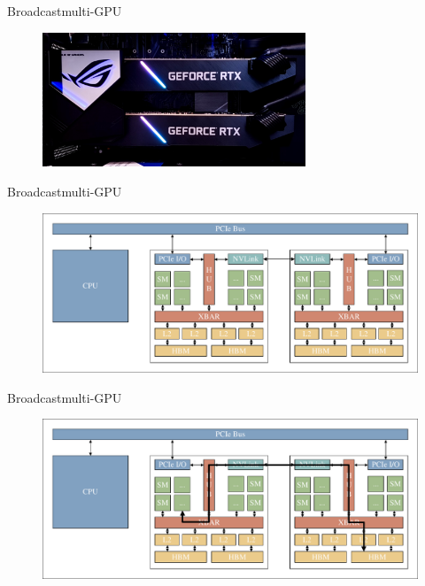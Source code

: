 \documentclass[aspectratio=169,compress]{beamer}
\begin{document}
\begin{frame}[fragile]{Broadcast}{multi-GPU}
\centering
	\begin{figure}
		\includegraphics[width=0.7\textwidth]{nvlink.png}
	\end{figure}
\end{frame}

\begin{frame}[fragile]{Broadcast}{multi-GPU}
\centering
	\begin{figure}
		\includegraphics[trim=20 20 20 20,clip,width=\textwidth]{nvlink_architecture_mem_model.pdf}
	\end{figure}
\end{frame}

\begin{frame}[fragile]{Broadcast}{multi-GPU}
\centering
	\begin{figure}
		\includegraphics[trim=20 20 20 20,clip,width=\textwidth]{nvlink_architecture_mem_model_path.pdf}
	\end{figure}
\end{frame}
\end{document}

